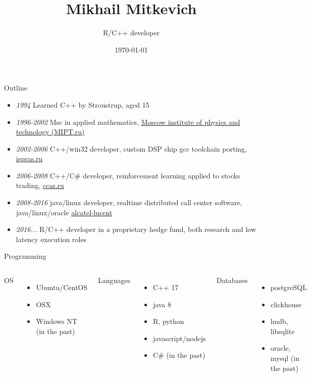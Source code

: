 \documentclass[10pt]{beamer}
\title{Mikhail Mitkevich}
\subtitle{R/C++ developer}
\date{\today}
\begin{document}
\maketitle

\begin{frame}[fragile]{Outline}

\begin{itemize}
\item  \textit{1994} Learned C++ by Stroustrup, aged 15
\item  \textit{1996-2002} Msc in applied mathematics, \href{https://www.timeshighereducation.com/world-university-rankings/moscow-institute-physics-and-technology}{Moscow institute of physics and technology (MIPT.ru)} 
\item \textit{2002-2006} C++/win32 developer, custom DSP chip gcc toolchain porting, \href{http://www.ispras.ru/en/}{ispras.ru} 
\item \textit{2006-2008} C++/C\# developer, reinforcement learning applied to stocks trading, \href{http://www.ccas.ru/index-e.htm}{ccas.ru}
\item  \textit{2008-2016} java/linux developer, realtime distributed call center software, java/linux/oracle \href{https://en.wikipedia.org/wiki/Alcatel-Lucent}{alcatel-lucent}
\item  \textit{2016...} R/C++ developer in a proprietary hedge fund, both research and low latency execution roles
\end{itemize}
\end{frame}

\begin{frame}{Programming}
  \begin{columns}[T,onlytextwidth]
      OS
      \begin{itemize}
        \item Ubuntu/CentOS
        \item OSX 
        \item Windows NT (in the past)
      \end{itemize}

      Languages
      \begin{itemize}
        \item C++ 17
        \item java 8
        \item R, python
        \item javascript/nodejs
        \item C\# (in the past)
      \end{itemize}

      Databases
      \begin{itemize}
        \item postgreSQL
        \item clickhouse
        \item lmdb, libsqlite
        \item oracle, mysql (in the past)
      \end{itemize}
  \end{columns}
\end{frame}
\end{document}
